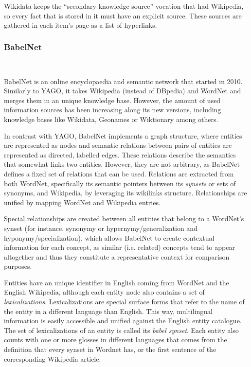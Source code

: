 Wikidata keeps the ``secondary knowledge source'' vocation that had Wikipedia, so every fact that is stored in it must have an explicit source. These sources are gathered in each item's page as a list of hyperlinks.

\subsubsection{BabelNet}~

BabelNet \cite{navigli2010,navigli2012} is an online encyclopaedia and semantic network that started in 2010. Similarly to YAGO, it takes Wikipedia (instead of DBpedia) and WordNet and merges them in an unique knowledge base. However, the amount of used information sources has been increasing along its new versions, including knowledge bases like Wikidata, Geonames or Wiktionary among others.

In contrast with YAGO, BabelNet implements a graph structure, where entities are represented as nodes and semantic relations between pairs of entities are represented as directed, labelled edges. These relations describe the semantics that somewhat links two entities. However, they are not arbitrary, as BabelNet defines a fixed set of relations that can be used. Relations are extracted from both WordNet, specifically its semantic pointers between its \emph{synsets} or sets of synonyms, and Wikipedia, by leveraging its wikilinks structure. Relationships are unified by mapping WordNet and Wikipedia entries.

Special relationships are created between all entities that belong to a WordNet's synset (for instance, synonymy or hypernymy/generalization and hyponymy/specialization), which allows BabelNet to create contextual information for each concept, as similar (i.e. related) concepts tend to appear altogether and thus they constitute a representative context for comparison purposes.

Entities have an unique identifier in English coming from WordNet and the English Wikipedia, although each entity node also contains a set of \emph{lexicalizations}. Lexicalizations are special surface forms that refer to the name of the entity in a different language than English. This way, multilingual information is easily accessible and unified against the English entity catalogue. The set of lexicalizations of an entity is called its \emph{babel synset}. Each entity also counts with one or more glosses in different languages that comes from the definition that every synset in Wordnet has, or the first sentence of the corresponding Wikipedia article.

